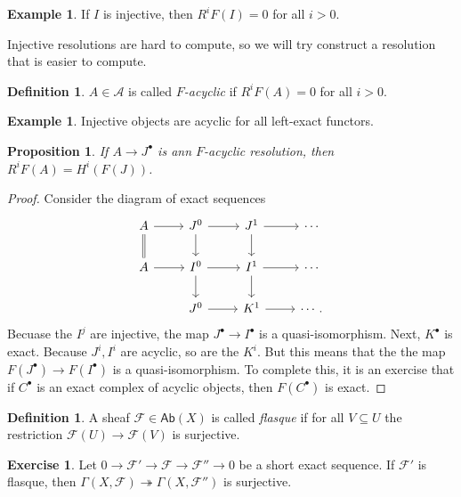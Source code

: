 \documentclass[leqno, openany]{memoir}
\newtheorem{prop}[thm]{Proposition}
\theoremstyle{definition}
\newtheorem{defn}[thm]{Definition}
\newtheorem{exm}[thm]{Example}
\newtheorem{exer}[thm]{Exercise}
\theoremstyle{remark}
\theoremstyle{plain}
\theoremstyle{definition}
\theoremstyle{remark}
\newcommand{\mc}[1]{\mathcal{#1}}
\newcommand{\ms}[1]{\mathsf{#1}}
\begin{document}
\begin{exm} If $I$ is injective, then $R^i F(I) = 0$ for all $i > 0$.
\end{exm}

Injective resolutions are hard to compute, so we will try construct a
resolution that is easier to compute. 

\begin{defn} $A \in \mc{A}$ is called \textit{$F$-acyclic} if $R^i F(A) = 0$
for all $i > 0$.  \end{defn}

\begin{exm} Injective objects are acyclic for all left-exact functors.
\end{exm}

\begin{prop} If $A \to J^{\bullet}$ is ann $F$-acyclic resolution, then $R^i
F(A) = H^i(F(J))$.  \end{prop}

\begin{proof} Consider the diagram of exact sequences \begin{equation*}
    \begin{tikzcd} A \ar{r} \ar[equal]{d} & J^0 \ar{r} \ar{d} & J^1 \ar{r}
        \ar{d} & \cdots \\ A \ar{r} & I^0 \ar{r} \ar{d} & I^1 \ar{r} \ar{d} &
        \cdots \\ & J^0 \ar{r} & K^1 \ar{r} & \cdots.  \end{tikzcd}
    \end{equation*} Becuase the $I^j$ are injective, the map $J^{\bullet} \to
    I^{\bullet}$ is a quasi-isomorphism. Next, $K^{\bullet}$ is exact. Because
    $J^i, I^i$ are acyclic, so are the $K^i$. But this means that the the map
    $F(J^{\bullet}) \to F(I^{\bullet})$ is a quasi-isomorphism. To complete
    this, it is an exercise that if $C^{\bullet}$ is an exact complex of
    acyclic objects, then $F(C^{\bullet})$ is exact.  \end{proof}

\begin{defn} A sheaf $\mc{F} \in \ms{Ab}(X)$ is called \textit{flasque} if for
all $V \subseteq U$ the restriction $\mc{F}(U) \to \mc{F}(V)$ is surjective.
\end{defn}

\begin{exer} Let $0 \to \mc{F}' \to \mc{F} \to \mc{F}'' \to 0$ be a short exact
sequence. If $\mc{F}'$ is flasque, then $\Gamma(X, \mc{F}) \twoheadrightarrow
\Gamma(X, \mc{F}'')$ is surjective.  \end{exer}
\end{document}
